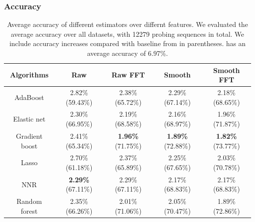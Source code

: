 \subsubsection{Accuracy}
\label{ssub:accuracy}
\begin{table}[htpb]
   \centering
   \caption{Average accuracy of different estimators over differnt features. We
      evaluated the average accuracy over all datasets, with 12279 probing
      sequences in total. We include accuracy increases compared with baseline
      from \cite{Yin2014} in parentheses. \cite{Yin2014} has an average
      accuracy of 6.97\%.}
   \label{tab:label}
   \begin{tabular}{|c|c|c|c|c|}
      \hline
      Algorithms     & Raw                      & Raw FFT                  & Smooth                   & Smooth FFT \\ \hline
      AdaBoost       & 2.82\%(59.43\%)          & 2.38\%(65.72\%)          & 2.29\%(67.14\%)          & 2.18\%(68.65\%)\\
      Elastic net    & 2.30\%(66.95\%)          & 2.19\%(68.58\%)          & 2.16\%(68.97\%)          & 1.96\%(71.87\%)\\
      Gradient boost & 2.41\%(65.34\%)          & \textbf{1.96\%}(71.75\%) & \textbf{1.89\%}(72.88\%) & \textbf{1.82\%}(73.77\%)\\
      Lasso          & 2.70\%(61.18\%)          & 2.37\%(65.89\%)          & 2.25\%(67.65\%)          & 2.03\%(70.78\%)\\
      NNR            & \textbf{2.29\%}(67.11\%) & 2.29\%(67.11\%)          & 2.17\%(68.83\%)          & 2.17\%(68.83\%)\\
      Random forest  & 2.35\%(66.26\%)          & 2.01\%(71.06\%)          & 2.05\%(70.47\%)          & 1.89\%(72.86\%)\\
      \hline
   \end{tabular}
\end{table}

